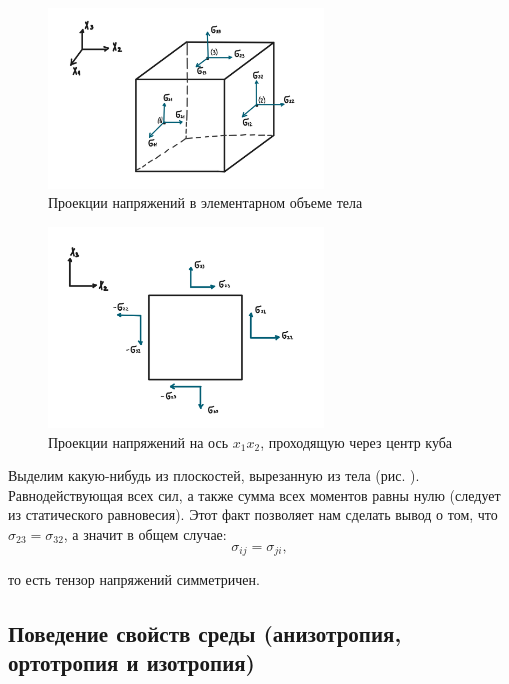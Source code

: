 \documentclass[12pt,a4paper]{article}
\begin{document}
    \pagebreak

    \begin{figure}[h]
      \centering
      \includegraphics[width=0.65\textwidth]{cube.jpeg}
      \caption{Проекции напряжений в элементарном объеме тела}
      \label{fig:cube}
    \end{figure}

    \begin{figure}[h]
      \centering
      \includegraphics[width=0.65\textwidth]{cube_cut.jpeg}
      \caption{Проекции напряжений на ось $x_1x_2$, проходящую через центр куба}
      \label{fig:cube_cut}
    \end{figure}

    \pagebreak

    Выделим какую-нибудь из плоскостей, вырезанную из тела (рис. ). Равнодействующая всех сил, а также сумма всех моментов равны нулю (следует из статического равновесия). Этот факт позволяет нам сделать вывод о том, что $\sigma_{23} = \sigma_{32}$, а значит в общем случае:
    \[
      \sigma_{ij} = \sigma_{ji},
    \]

    \noindent то есть тензор напряжений симметричен.

    \subsection{Поведение свойств среды (анизотропия, ортотропия и изотропия)}
\end{document}
